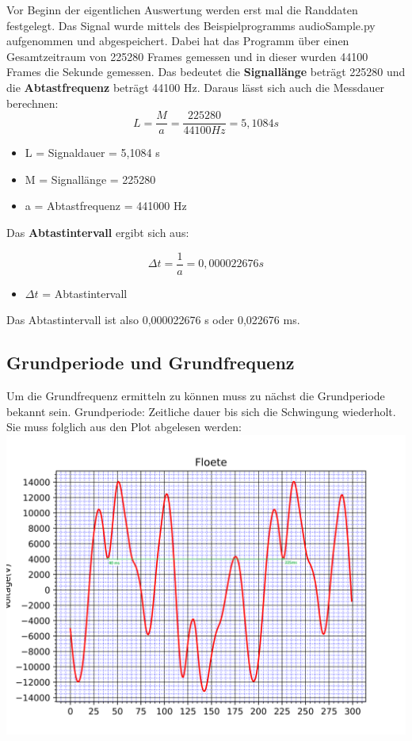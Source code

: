 Vor Beginn der eigentlichen Auswertung werden erst  mal die Randdaten festgelegt. Das Signal wurde mittels des Beispielprogramms audioSample.py aufgenommen und abgespeichert. Dabei hat das Programm über einen Gesamtzeitraum von 225280 Frames gemessen und in dieser wurden 44100 Frames die Sekunde gemessen.
Das bedeutet die \textbf{Signallänge} beträgt 225280 und die \textbf{Abtastfrequenz} beträgt 44100 Hz.
Daraus lässt sich auch die Messdauer berechnen:
\begin{equation}
	L = \frac{M}{a} = \frac{225280}{44100 Hz} = 5,1084 s
\end{equation}
\begin{itemize}
	\item L = Signaldauer = 5,1084 s
	\item M = Signallänge = 225280
	\item a = Abtastfrequenz = 441000 Hz 
\end{itemize}

Das \textbf{Abtastintervall} ergibt sich aus:

\begin{equation}
	\Delta t = \frac{1}{a} = 0,000022676 s
\end{equation}
\begin{itemize}
	\item $\Delta t$ = Abtastintervall
\end{itemize}

Das Abtastintervall ist also 0,000022676 s oder 0,022676 ms.

\subsection*{Grundperiode und Grundfrequenz}

Um die Grundfrequenz ermitteln zu können muss zu nächst die Grundperiode bekannt sein.
Grundperiode: Zeitliche dauer bis sich die Schwingung wiederholt. Sie muss folglich aus den Plot abgelesen werden:
\includegraphics[scale=0.1]{media/Signal_Raster_Periode.png}
\label{fig: Signal mit Periode}

